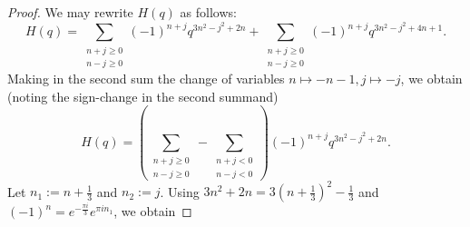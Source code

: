 \documentclass[12pt,reqno]{amsart}
\renewcommand{\(}{\left\(}
\renewcommand{\)}{\right\)}
\numberwithin{equation}{section}
\theoremstyle{plain}
\theoremstyle{definition}
\numberwithin{equation}{section}
\begin{document}
\begin{proof}%
	
We may rewrite $H(q)$ as follows:  %
\begin{equation*}%
H(q)=\sum_{\substack{n+j\ge 0\\n-j\ge 0}}(-1)^{n+j}q^{3n^2-j^2+2n}+\sum_{\substack{n+j\ge 0\\n-j\ge 0}}(-1)^{n+j}q^{3n^2-j^2+4n+1}.
\end{equation*}
  Making in the second sum the change of variables $n\mapsto -n-1, j\mapsto -j$, we obtain (noting the sign-change in the second summand) %
\begin{equation*}%
H(q)=\left(\sum_{\substack{n+j\ge 0\\n-j\ge 0}}-\sum_{\substack{n+j< 0\\n-j< 0}}\right)(-1)^{n+j}q^{3n^2-j^2+2n}.
\end{equation*}
Let $n_1:=n+\frac 13$ and $n_2:=j$. Using $3n^2+2n=3(n+\frac13)^2-\frac13$ and $(-1)^n=e^{-\frac{\pi i}{3}}e^{\pi in_1}$, we obtain  %

\end{proof}
\end{document}
